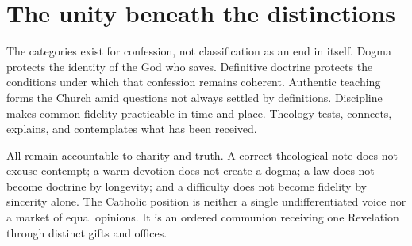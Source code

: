\section{The unity beneath the distinctions}

The categories exist for confession, not classification as an end in itself.
Dogma protects the identity of the God who saves. Definitive doctrine protects
the conditions under which that confession remains coherent. Authentic
teaching forms the Church amid questions not always settled by definitions.
Discipline makes common fidelity practicable in time and place. Theology tests,
connects, explains, and contemplates what has been received.

All remain accountable to charity and truth. A correct theological note does
not excuse contempt; a warm devotion does not create a dogma; a law does not
become doctrine by longevity; and a difficulty does not become fidelity by
sincerity alone. The Catholic position is neither a single undifferentiated
voice nor a market of equal opinions. It is an ordered communion receiving one
Revelation through distinct gifts and offices.

